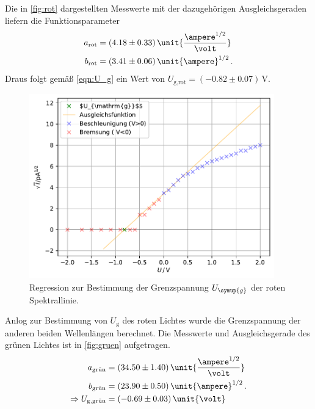 Die in \autoref{fig:rot} dargestellten Messwerte mit der dazugehörigen Ausgleichsgeraden liefern die Funktionsparameter 
\begin{align*}
    a_{\text{rot}}&=(4.18\pm 0.33) \, \unit{\frac{\ampere ^{1/2}}{\volt}}\\
    b_{\text{rot}}&=(3.41\pm 0.06) \, \unit{\ampere}^{1/2}\, .\\
\end{align*}
Draus folgt gemäß \autoref{eqn:U_g} ein Wert von $U_{\text{g,rot}}=(-0.82\pm 0.07)\, \unit{\volt}$.
\begin{figure}
    \centering
    \includegraphics[height = 8cm]{build/plotrot.pdf}
    \caption{Regression zur Bestimmung der Grenzspannung $U_{\symup{g}}$ der roten Spektrallinie.}
    \label{fig:rot}
\end{figure}
Anlog zur Bestimmung von $U_{\text{g}}$ des roten Lichtes wurde die Grenzspannung der anderen beiden Wellenlängen 
berechnet.
Die Messwerte und Ausgleichsgerade des grünen Lichtes ist in \autoref{fig:gruen} aufgetragen.
\begin{align*}
    a_{\text{grün}}&=(34.50\pm 1.40) \, \unit{\frac{\ampere ^{1/2}}{\volt}}\\
    b_{\text{grün}}&=(23.90\pm 0.50) \, \unit{\ampere}^{1/2}\, .\\
    \Rightarrow U_{\text{g,grün}}&=(-0.69\pm 0.03)\, \unit{\volt}\\
\end{align*}

